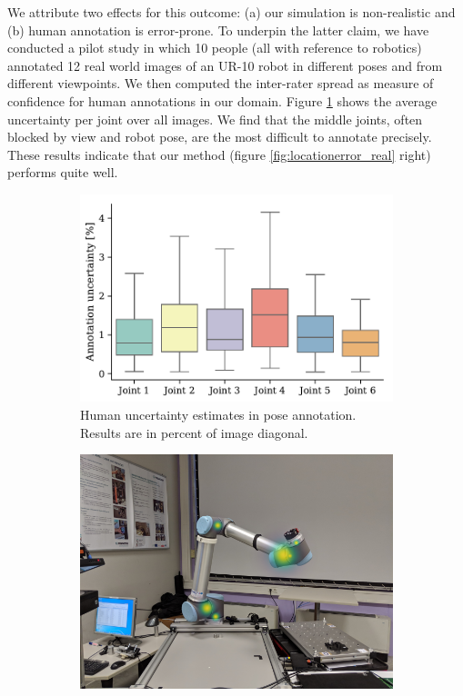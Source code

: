 \documentclass[conference]{IEEEtran}
\begin{document}
    We attribute two effects for this outcome: (a) our simulation is non-realistic and (b) human annotation is error-prone. To underpin the latter claim, we have conducted a pilot study in which 10 people (all with reference to robotics) annotated 12 real world images of an UR-10 robot in different poses and from different viewpoints. We then computed the inter-rater spread as measure of confidence for human annotations in our domain. Figure \ref{fig:humanuncertainty} shows the average uncertainty per joint over all images. We find that the middle joints, often blocked by view and robot pose, are the most difficult to annotate precisely. These results indicate that our method (figure \ref{fig:locationerror_real} right) performs quite well.

    \begin{figure}[!h]
        \centering
        \begin{subfigure}[t]{0.49\columnwidth}
            \includegraphics[width=\columnwidth]{figures/results/human_uncertainty/human_uncertainty.pdf}
            \caption {
                \label{fig:humanuncertainty} 
                Human uncertainty estimates in pose annotation. Results are in percent of image diagonal.
            }
        \end{subfigure}
        \begin{subfigure}[t]{0.49\columnwidth}
            \iffinalcopy
                \includegraphics[width=\columnwidth]{figures/results/human_uncertainty/human_uncertainty_belief.png}

\end{subfigure}
\end{figure}
\end{document}
